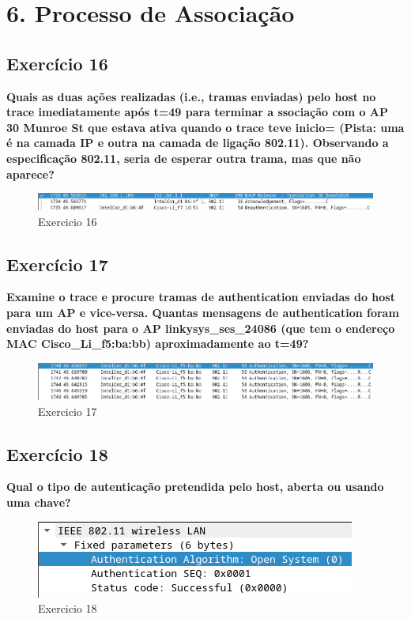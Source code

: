 \documentclass[a4paper]{report}
\begin{document}
\chapter{6. Processo de Associação}
\section{Exercício 16}
\textbf{Quais as duas ações realizadas (i.e., tramas enviadas) pelo host no
    trace imediatamente após t=49 para terminar a ssociação com o AP 30 Munroe
    St que estava ativa quando o trace teve inicio= (Pista: uma é na camada IP e
    outra na camada de ligação 802.11). Observando a especificação 802.11, seria
    de esperar outra trama, mas que não aparece?}
\begin{figure}[H]
    \centering 
    \includegraphics[width=\textwidth]{images/Ex16.png}  
    \caption{Exercicio 16}
    \label{fig:ex16}
\end{figure}

\section{Exercício 17}
\textbf{Examine o trace e procure tramas de authentication enviadas do host para
    um AP e vice-versa. Quantas mensagens de authentication foram enviadas do
    host para o AP linkysys\_ses\_24086 (que tem o endereço MAC
    Cisco\_Li\_f5:ba:bb) aproximadamente ao t=49?}
\begin{figure}[H]
    \centering 
    \includegraphics[width=\textwidth]{images/Ex17.png}  
    \caption{Exercicio 17}
    \label{fig:ex17}
\end{figure}

\section{Exercício 18}
\textbf{Qual o tipo de autenticação pretendida pelo host, aberta ou usando uma
    chave?}
\begin{figure}[H]
    \centering 
    \includegraphics[width=\textwidth]{images/ex18.png}  
    \caption{Exercicio 18}
    \label{fig:ex18}
\end{figure}
\end{document}
